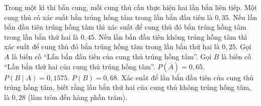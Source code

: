 \begin{ex}
Trong một kì thi bắn cung, mỗi cung thủ cần thực hiện hai lần bắn liên tiếp. Một cung thủ có xác suất bắn trúng hồng tâm trong lần bắn đầu tiên là $0{,}35$. Nếu lần bắn đầu tiên trúng hồng tâm thì xác suất để cung thủ đó bắn trúng hồng tâm trong lần bắn thứ hai là $0{,}45$. Nếu lần bắn đầu tiên không trúng hồng tâm thì xác suất để cung thủ đó bắn trúng hồng tâm trong lần bắn thứ hai là $0{,}25$.
Gọi $A$ là biến cố ``Lần bắn đầu tiên của cung thủ trúng hồng tâm''. Gọi $B$ là biến cố ``Lần bắn thứ hai của cung thủ trúng hồng tâm''.
\choiceTF
{\True $P(\overline A)=0{,}65$.}
{$P(B\mid A)=0{,}1575$.}
{$P(B)=0{,}68$.}
{\True Xác suất để lần bắn đầu tiên của cung thủ trúng hồng tâm, biết rằng lần bắn thứ hai của cung thủ không trúng hồng tâm, là $0{,}28$ (làm tròn đến hàng phần trăm).}
\end{ex}
